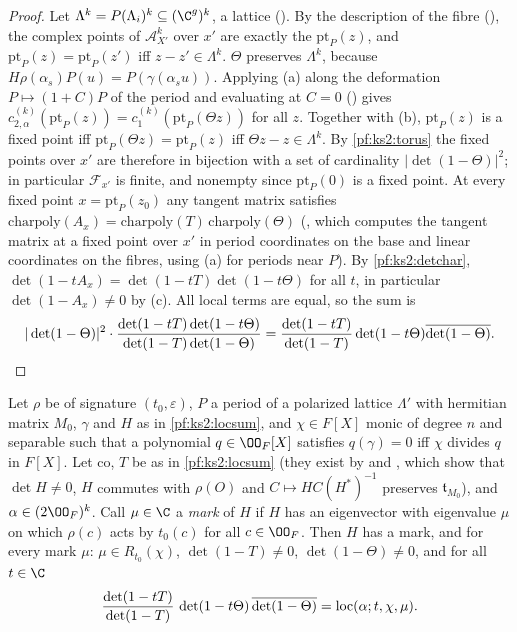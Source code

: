 \begin{proof}
Let $\Lambda^k=P(\Lambda_i)^k\subseteq(\C^g)^k$, a lattice
(). By the description of the fibre
(), the complex points of $\mathcal A_{X'}^k$ over $x'$ are
exactly the $\mathrm{pt}_P(z)$, and $\mathrm{pt}_P(z)=\mathrm{pt}_P(z')$ iff $z-z'\in\Lambda^k$. $\Theta$
preserves $\Lambda^k$, because $H\rho(\alpha_s)P(u)=P(\gamma(\alpha_su))$. Applying (a) along the
deformation $P\mapsto(1+C)P$ of the period and evaluating at $C=0$
() gives
$c_{2,\alpha}^{(k)}(\mathrm{pt}_P(z))=c_1^{(k)}(\mathrm{pt}_P(\Theta z))$ for all $z$. Together with (b),
$\mathrm{pt}_P(z)$ is a fixed point iff $\mathrm{pt}_P(\Theta z)=\mathrm{pt}_P(z)$ iff $\Theta z-z\in\Lambda^k$.
By \cref{pf:ks2:torus} the fixed points over $x'$ are therefore in bijection with a set of cardinality
$|\det(1-\Theta)|^2$; in particular $\mathcal F_{x'}$ is finite, and nonempty since $\mathrm{pt}_P(0)$ is a
fixed point. At every fixed point $x=\mathrm{pt}_P(z_0)$ any tangent matrix satisfies
$\mathrm{charpoly}(A_x)=\mathrm{charpoly}(T)\,\mathrm{charpoly}(\Theta)$
(, which computes the tangent matrix at a fixed point
over $x'$ in period coordinates on the base and linear coordinates on the fibres, using (a) for
periods near $P$). By \cref{pf:ks2:detchar},
$\det(1-tA_x)=\det(1-tT)\det(1-t\Theta)$ for all $t$, in particular $\det(1-A_x)\ne0$ by (c). All local
terms are equal, so the sum is
\[
|\det(1-\Theta)|^2\cdot\frac{\det(1-tT)\det(1-t\Theta)}{\det(1-T)\det(1-\Theta)}
=\frac{\det(1-tT)}{\det(1-T)}\det(1-t\Theta)\overline{\det(1-\Theta)}.\qedhere
\]
\end{proof}

\begin{lemma}[Eigenvalues]\label{pf:ks2:eigtop}
Let $\rho$ be of signature $(t_0,\varepsilon)$, $P$ a period of a polarized lattice $\Lambda'$ with hermitian
matrix $M_0$, $\gamma$ and $H$ as in \cref{pf:ks2:locsum}, and $\chi\in F[X]$ monic of degree $n$ and
separable such that a polynomial $q\in\kstwoOF[X]$ satisfies $q(\gamma)=0$ iff $\chi$ divides $q$ in $F[X]$. Let $\mathrm{co}$, $T$ be as in \cref{pf:ks2:locsum} (they
exist by  and , which
show that $\det H\ne0$, $H$ commutes with $\rho(O)$ and $C\mapsto HC(H^*)^{-1}$ preserves $\mathfrak{t}_{M_0}$),
and $\alpha\in(2\kstwoOF)^k$. Call $\mu\in\C$ a \emph{mark} of $H$ if $H$ has
an eigenvector with eigenvalue $\mu$ on which $\rho(c)$ acts by $t_0(c)$ for all $c\in\kstwoOF$. Then $H$ has a
mark, and for every mark $\mu$: $\mu\in R_{t_0}(\chi)$, $\det(1-T)\ne0$, $\det(1-\Theta)\ne0$, and for all
$t\in\C$
\begin{equation}\label{pf:ks2:eq:eigtop}
\frac{\det(1-tT)}{\det(1-T)}\,\det(1-t\Theta)\,\overline{\det(1-\Theta)}=\mathrm{loc}(\alpha;t,\chi,\mu).
\end{equation}
\end{lemma}

